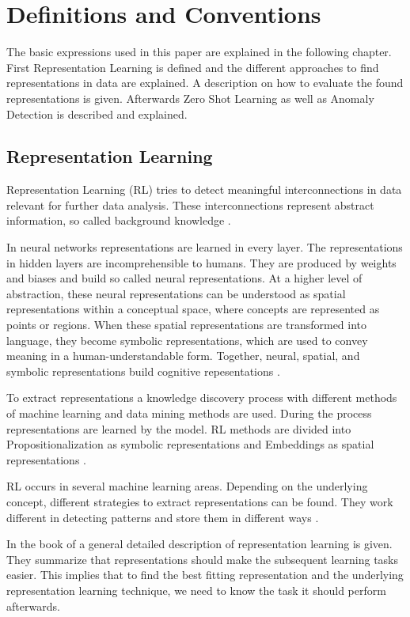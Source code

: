 \section{Definitions and Conventions}\label{theory}
The basic expressions used in this paper are explained in the following chapter. First Representation Learning is defined and the different approaches to find representations in data are explained. A description on how to evaluate the found representations is given. Afterwards Zero Shot Learning as well as Anomaly Detection is described and explained.
\subsection{Representation Learning}
Representation Learning (RL) tries to detect meaningful interconnections in data relevant for further data analysis. These interconnections represent abstract information, so called background knowledge .

In neural networks representations are learned in every layer. The representations in hidden layers are incomprehensible to humans. They are produced by weights and biases and build so called neural representations. At a higher level of abstraction, these neural representations can be understood as spatial representations within a conceptual space, where concepts are represented as points or regions. When these spatial representations are transformed into language, they become symbolic representations, which are used to convey meaning in a human-understandable form. Together, neural, spatial, and symbolic representations build cognitive repesentations .

To extract representations a knowledge discovery process with different methods of machine learning and data mining methods are used. During the process representations are learned by the model. RL methods are divided into Propositionalization as symbolic representations and Embeddings as spatial representations .

RL occurs in several machine learning areas. Depending on the underlying concept, different strategies to extract representations can be found. They work different in detecting patterns and store them in different ways .

In the book of  a general detailed description of representation learning is given. They summarize that representations should make the subsequent learning tasks easier. This implies that to find the best fitting representation and the underlying representation learning technique, we need to know the task it should perform afterwards.

